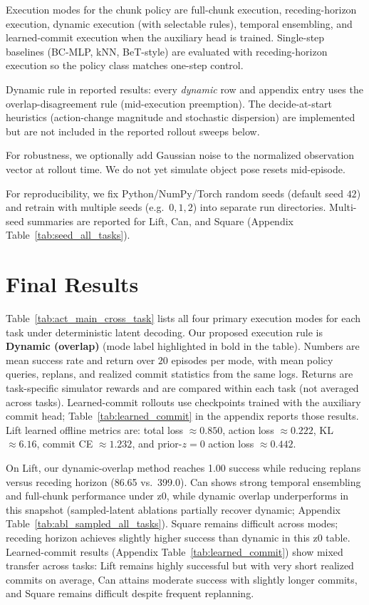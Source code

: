 \documentclass{article}
\begin{document}
Execution modes for the chunk policy are full-chunk execution, receding-horizon execution, dynamic execution (with selectable rules), temporal ensembling, and learned-commit execution when the auxiliary head is trained. Single-step baselines (BC-MLP, kNN, BeT-style) are evaluated with receding-horizon execution so the policy class matches one-step control.

Dynamic rule in reported results: every \emph{dynamic} row and appendix entry uses the overlap-disagreement rule (mid-execution preemption). The decide-at-start heuristics (action-change magnitude and stochastic dispersion) are implemented but are not included in the reported rollout sweeps below.

For robustness, we optionally add Gaussian noise to the normalized observation vector at rollout time. We do not yet simulate object pose resets mid-episode.

For reproducibility, we fix Python/NumPy/Torch random seeds (default seed $42$) and retrain with multiple seeds (e.g.\ $0,1,2$) into separate run directories. Multi-seed summaries are reported for Lift, Can, and Square (Appendix Table~\ref{tab:seed_all_tasks}).

\section{Final Results}

Table~\ref{tab:act_main_cross_task} lists all four primary execution modes for each task under deterministic latent decoding. Our proposed execution rule is \textbf{Dynamic (overlap)} (mode label highlighted in bold in the table). Numbers are mean success rate and return over $20$ episodes per mode, with mean policy queries, replans, and realized commit statistics from the same logs. Returns are task-specific simulator rewards and are compared within each task (not averaged across tasks). Learned-commit rollouts use checkpoints trained with the auxiliary commit head; Table~\ref{tab:learned_commit} in the appendix reports those results. Lift learned offline metrics are: total loss $\approx 0.850$, action loss $\approx 0.222$, KL $\approx 6.16$, commit CE $\approx 1.232$, and prior-$z{=}0$ action loss $\approx 0.442$.

On Lift, our dynamic-overlap method reaches 1.00 success while reducing replans versus receding horizon (86.65 vs.\ 399.0). Can shows strong temporal ensembling and full-chunk performance under z0, while dynamic overlap underperforms in this snapshot (sampled-latent ablations partially recover dynamic; Appendix Table~\ref{tab:abl_sampled_all_tasks}). Square remains difficult across modes; receding horizon achieves slightly higher success than dynamic in this z0 table.
Learned-commit results (Appendix Table~\ref{tab:learned_commit}) show mixed transfer across tasks: Lift remains highly successful but with very short realized commits on average, Can attains moderate success with slightly longer commits, and Square remains difficult despite frequent replanning.
\end{document}
